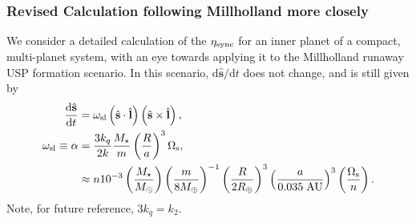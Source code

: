 \documentclass[11pt,
        usenames, %
        dvipsnames %
    ]{article}
\newcommand*{\rd}[2]{\frac{\mathrm{d}#1}{\mathrm{d}#2}}
\newcommand*{\rdil}[2]{\mathrm{d}#1 / \mathrm{d}#2}
\newcommand*{\bm}[1]{\boldsymbol{\mathbf{#1}}}
\newcommand*{\p}[1]{\left(#1\right)}
\newcommand*{\uv}[1]{\hat{\bm{#1}}}
\begin{document}
\subsubsection{Revised Calculation following Millholland more closely}

We consider a detailed calculation of the $\eta_{\rm sync}$ for an inner planet
of a compact, multi-planet system, with an eye towards applying it to the
Millholland runaway USP formation scenario. In this scenario, $\rdil{\uv{s}}{t}$
does not change, and is still given by
\begin{align}
    \rd{\uv{s}}{t} &= \omega_{\rm sl}\p{\uv{s} \cdot \uv{l}}
            \p{\uv{s} \times \uv{l}},\\
    \omega_{\rm sl} \equiv \alpha &= \frac{3k_q}{2k}\frac{M_\star}{m}
        \p{\frac{R}{a}}^3 \Omega_{\rm s},\\
        &\approx n10^{-3} \p{\frac{M_{\star}}{M_{\odot}}}
            \p{\frac{m}{8 M_{\oplus}}}^{-1}
            \p{\frac{R}{2 R_{\oplus}}}^3
            \p{\frac{a}{0.035\;\mathrm{AU}}}^3
            \p{\frac{\Omega_{\rm s}}{n}}.
\end{align}
Note, for future reference, $3k_q = k_2$.
\end{document}
